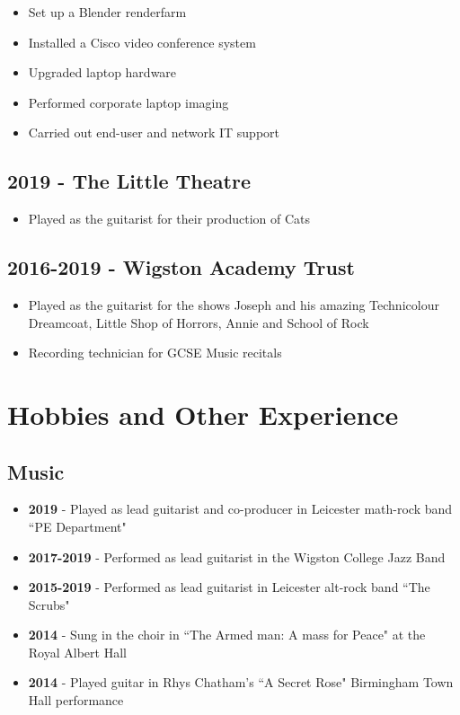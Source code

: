 \documentclass{article}
\begin{document}
\begin{itemize}[noitemsep]

\item Set up a Blender renderfarm
\item Installed a Cisco video conference system 
\item Upgraded laptop hardware
\item Performed corporate laptop imaging
\item Carried out end-user and network IT support

\end{itemize}

\subsection{2019 - The Little Theatre}
\begin{itemize}[noitemsep]

\item Played as the guitarist for their production of Cats

\end{itemize}


\subsection{2016-2019 - Wigston Academy Trust}
\begin{itemize}[noitemsep]

\item Played as the guitarist for the shows Joseph and his amazing Technicolour Dreamcoat, Little Shop of Horrors, Annie and School of Rock
\item Recording technician for GCSE Music recitals

\end{itemize}


\section{Hobbies and Other Experience}
\subsection{Music}
\begin{itemize}[noitemsep]

\item \textbf{2019} - Played as lead guitarist and co-producer in Leicester math-rock band ``PE Department"
\item \textbf{2017-2019} - Performed as lead guitarist in the Wigston College Jazz Band
\item \textbf{2015-2019} - Performed as lead guitarist in Leicester alt-rock band ``The Scrubs"
\item \textbf{2014} - Sung in the choir in ``The Armed man: A mass for Peace" at the Royal Albert Hall
\item \textbf{2014} - Played guitar in Rhys Chatham's ``A Secret Rose" Birmingham Town Hall performance

\end{itemize}
\end{document}
